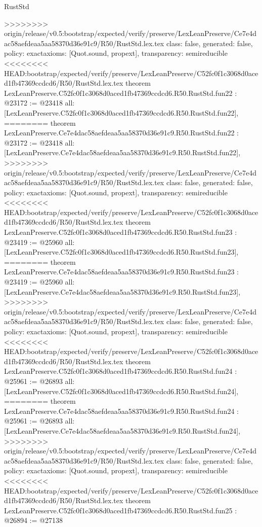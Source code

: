 \begin{lexlean}{RustStd}
\begin{coremodule}
{\begin{coremodule}
{{{{{{{{{{{{{{{{{{{{{{{{{>>>>>>>> origin/release/v0.5:bootstrap/expected/verify/preserve/LexLeanPreserve/Ce7e4dac58aefdeaa5aa58370d36e91c9/R50/RustStd.lex.tex
  class: false,
  generated: false,
  policy: exact{axioms: [Quot.sound, propext]},
  transparency: semireducible
}
<<<<<<<< HEAD:bootstrap/expected/verify/preserve/LexLeanPreserve/C52fc0f1c3068d0aced1fb47369ccdcd6/R50/RustStd.lex.tex
theorem LexLeanPreserve.C52fc0f1c3068d0aced1fb47369ccdcd6.R50.RustStd.fun22 : @23172 := @23418 {
  all: [LexLeanPreserve.C52fc0f1c3068d0aced1fb47369ccdcd6.R50.RustStd.fun22],
========
theorem LexLeanPreserve.Ce7e4dac58aefdeaa5aa58370d36e91c9.R50.RustStd.fun22 : @23172 := @23418 {
  all: [LexLeanPreserve.Ce7e4dac58aefdeaa5aa58370d36e91c9.R50.RustStd.fun22],
>>>>>>>> origin/release/v0.5:bootstrap/expected/verify/preserve/LexLeanPreserve/Ce7e4dac58aefdeaa5aa58370d36e91c9/R50/RustStd.lex.tex
  class: false,
  generated: false,
  policy: exact{axioms: [Quot.sound, propext]},
  transparency: semireducible
}
<<<<<<<< HEAD:bootstrap/expected/verify/preserve/LexLeanPreserve/C52fc0f1c3068d0aced1fb47369ccdcd6/R50/RustStd.lex.tex
theorem LexLeanPreserve.C52fc0f1c3068d0aced1fb47369ccdcd6.R50.RustStd.fun23 : @23419 := @25960 {
  all: [LexLeanPreserve.C52fc0f1c3068d0aced1fb47369ccdcd6.R50.RustStd.fun23],
========
theorem LexLeanPreserve.Ce7e4dac58aefdeaa5aa58370d36e91c9.R50.RustStd.fun23 : @23419 := @25960 {
  all: [LexLeanPreserve.Ce7e4dac58aefdeaa5aa58370d36e91c9.R50.RustStd.fun23],
>>>>>>>> origin/release/v0.5:bootstrap/expected/verify/preserve/LexLeanPreserve/Ce7e4dac58aefdeaa5aa58370d36e91c9/R50/RustStd.lex.tex
  class: false,
  generated: false,
  policy: exact{axioms: [Quot.sound, propext]},
  transparency: semireducible
}
<<<<<<<< HEAD:bootstrap/expected/verify/preserve/LexLeanPreserve/C52fc0f1c3068d0aced1fb47369ccdcd6/R50/RustStd.lex.tex
theorem LexLeanPreserve.C52fc0f1c3068d0aced1fb47369ccdcd6.R50.RustStd.fun24 : @25961 := @26893 {
  all: [LexLeanPreserve.C52fc0f1c3068d0aced1fb47369ccdcd6.R50.RustStd.fun24],
========
theorem LexLeanPreserve.Ce7e4dac58aefdeaa5aa58370d36e91c9.R50.RustStd.fun24 : @25961 := @26893 {
  all: [LexLeanPreserve.Ce7e4dac58aefdeaa5aa58370d36e91c9.R50.RustStd.fun24],
>>>>>>>> origin/release/v0.5:bootstrap/expected/verify/preserve/LexLeanPreserve/Ce7e4dac58aefdeaa5aa58370d36e91c9/R50/RustStd.lex.tex
  class: false,
  generated: false,
  policy: exact{axioms: [Quot.sound, propext]},
  transparency: semireducible
}
<<<<<<<< HEAD:bootstrap/expected/verify/preserve/LexLeanPreserve/C52fc0f1c3068d0aced1fb47369ccdcd6/R50/RustStd.lex.tex
theorem LexLeanPreserve.C52fc0f1c3068d0aced1fb47369ccdcd6.R50.RustStd.fun25 : @26894 := @27138 {
}}}}}}}}}}}}}}}}}}}}}}}}}}}}
\end{coremodule}}
\end{coremodule}
\end{lexlean}
